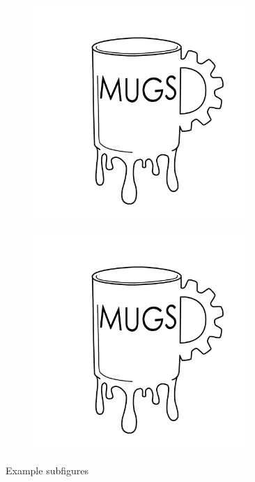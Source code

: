 \documentclass[11pt]{article}
\begin{document}
\begin{figure}[H]
\begin{subfigure}[b]{0.5\textwidth}
	\end{subfigure}
	\vfill
	\vspace*{0.5cm}
	\begin{subfigure}[b]{0.5\textwidth}
		\centering
		\includegraphics[width=0.9\textwidth]{"images/half filled mugs"}
	\end{subfigure}
	\hfill
	\begin{subfigure}[b]{0.5\textwidth}
		\centering
		\includegraphics[width=0.9\textwidth]{"images/half filled mugs"}
	\end{subfigure}
	\caption{Example subfigures}
	\label{subfig}
\end{figure}
\end{document}
